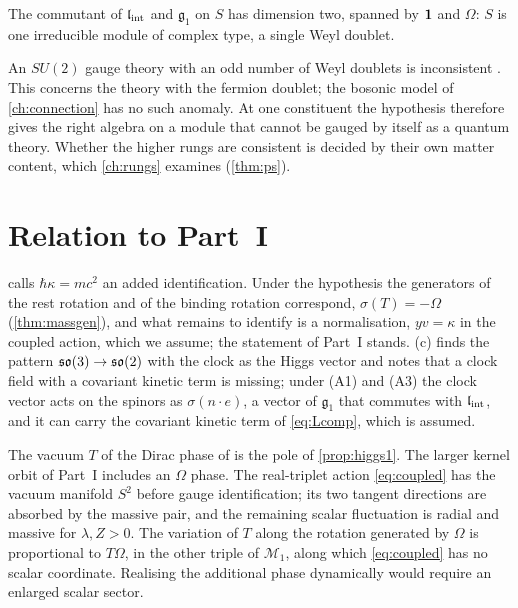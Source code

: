 \begin{proposition}
\label{prop:onedoublet}
The commutant of $\mathfrak l_{\rm int}$ and $\mathfrak g_1$ on $S$ has dimension two, spanned by $\mathbf 1$ and $\Omega$: $S$ is one irreducible module of
complex type, a single Weyl doublet.
\end{proposition}

An $SU(2)$ gauge theory with an odd number of Weyl doublets is inconsistent \cite{Witten82}. This concerns the theory with the fermion
doublet; the bosonic model of \cref{ch:connection} has no such anomaly. At one constituent the hypothesis therefore gives the right algebra
on a module that cannot be gauged by itself as a quantum theory. Whether the higher rungs are consistent is decided by their own matter
content, which \cref{ch:rungs} examines (\cref{thm:ps}).

\section{Relation to Part~I}

 calls $\hbar\kappa=mc^2$ an added identification. Under the hypothesis the generators of the rest rotation and of the
binding rotation correspond, $\sigma(T)=-\Omega$ (\cref{thm:massgen}), and what remains to identify is a normalisation, $yv=\kappa$ in the
coupled action, which we assume; the statement of Part~I stands. (c) finds the pattern $\mathfrak{so}(3)\to\mathfrak{so}(2)$ with the clock as the
Higgs vector and notes that a clock field with a covariant kinetic term is missing; under (A1) and (A3) the clock vector acts on the spinors
as $\sigma(n\cdot e)$, a vector of $\mathfrak g_1$ that commutes with $\mathfrak l_{\rm int}$, and it can carry the covariant kinetic term of
\cref{eq:Lcomp}, which is assumed.

The vacuum $T$ of the Dirac phase of  is the pole of \cref{prop:higgs1}. The larger kernel orbit of Part~I includes an
$\Omega$ phase. The real-triplet action \cref{eq:coupled} has the vacuum manifold $S^2$ before gauge identification; its two tangent
directions are absorbed by the massive pair, and the remaining scalar fluctuation is radial and massive for $\lambda,Z>0$. The variation of
$T$ along the rotation generated by $\Omega$ is proportional to $T\Omega$, in the other triple of $\mathcal M_1$, along which
\cref{eq:coupled} has no scalar coordinate. Realising the additional phase dynamically would require an enlarged scalar sector.
